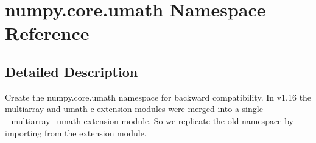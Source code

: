 \hypertarget{namespacenumpy_1_1core_1_1umath}{}\section{numpy.\+core.\+umath Namespace Reference}
\label{namespacenumpy_1_1core_1_1umath}


\subsection{Detailed Description}
\begin{DoxyVerb}Create the numpy.core.umath namespace for backward compatibility. In v1.16
the multiarray and umath c-extension modules were merged into a single
_multiarray_umath extension module. So we replicate the old namespace
by importing from the extension module.\end{DoxyVerb}
 